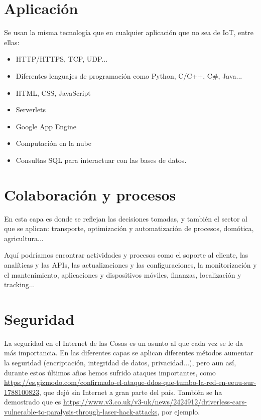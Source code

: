 \documentclass{article}
\begin{document}
\section{Aplicación}

Se usan la misma tecnología que en cualquier aplicación que no sea de IoT, entre ellas:

\begin{itemize}
\item HTTP/HTTPS, TCP, UDP...
\item Diferentes lenguajes de programación como Python, C/C++, C\#, Java...
\item HTML, CSS, JavaScript
\item Serverlets
\item Google App Engine
\item Computación en la nube
\item Consultas SQL para interactuar con las bases de datos.
\end{itemize}

\section{Colaboración y procesos}

En esta capa es donde se reflejan las decisiones tomadas, y también el sector al que se aplican: transporte, optimización y automatización de procesos, domótica, agricultura...

Aquí podríamos encontrar actividades y procesos como el soporte al cliente, las analíticas y las APIs, las actualizaciones y las configuraciones, la monitorización y el mantenimiento, aplicaciones y dispositivos móviles, finanzas, localización y tracking...

\section{Seguridad}

La seguridad en el Internet de las Cosas es un asunto al que cada vez se le da más importancia. En las diferentes capas se aplican diferentes métodos aumentar la seguridad (encriptación, integridad de datos, privacidad...), pero aun así, durante estos últimos años hemos sufrido ataques importantes, como \href{el DDoS sufrido por uno de los servidores más grandes de EE.UU.}{https://es.gizmodo.com/confirmado-el-ataque-ddos-que-tumbo-la-red-en-eeuu-sur-1788100823}, que dejó sin Internet a gran parte del país. También se ha demostrado que es \href{relativamente fácil atacar un coche autónomo}{https://www.v3.co.uk/v3-uk/news/2424912/driverless-cars-vulnerable-to-paralysis-through-laser-hack-attacks}, por ejemplo.
\end{document}
